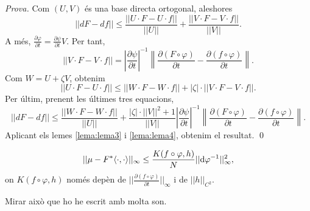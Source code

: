 {\color{green!50!black}
\textit{Prova.} Com $(U,V)$ és una base directa ortogonal, aleshores 
\begin{equation*}
    ||dF-df||\le \frac{||U\cdot F - U\cdot f||}{||U||} + \frac{||V\cdot F - V\cdot f||}{||V||}.
\end{equation*}
A més, $\frac{\partial \varphi}{\partial t} = \frac{\partial \psi}{\partial t}V$. Per tant,
\begin{equation}\label{eq: dospuntonze}
    ||V\cdot F - V\cdot f|| = \left|\frac{\partial\psi}{\partial t}\right|^{-1} \left\| \frac{\partial(F\circ\varphi)}{\partial t} - \frac{\partial(f\circ\varphi)}{\partial t} \right\|.
\end{equation}
Com $W=U+\zeta V$, obtenim
\begin{equation*}
    ||U\cdot F - U\cdot f|| \le ||W\cdot F - W\cdot f|| + |\zeta |\cdot||V\cdot F - V\cdot f||.
\end{equation*}
Per últim, prenent les últimes tres equacions,
\begin{equation}\label{eq:demo lema 6}
    ||dF-df||\le \frac{||W\cdot F - W\cdot f||}{||U||} + \frac{|\zeta|\cdot||V||^2+1}{||V||}\left|\frac{\partial\psi}{\partial t}\right|^{-1} \left\| \frac{\partial(F\circ\varphi)}{\partial t} - \frac{\partial(f\circ\varphi)}{\partial t} \right\|.
\end{equation}
Aplicant els lemes \ref{lema:lema3} i \ref{lema:lema4}, obtenim el resultat. \qed
}
\begin{lema}
    \label{lema:lema7}
    \begin{equation*}
        ||\mu-F^*\langle\cdot, \cdot\rangle||_\infty \le \frac{K(f\circ\varphi,h)}{N}||\textrm d\varphi ^{-1}||_\infty^2,
    \end{equation*}
    on $K(f\circ\varphi,h)$ només depèn de $||\frac{\partial(f\circ\varphi)}{\partial t}||_\infty$ i de $||h||_{C^2}$.
\end{lema}
{\color{blue} Mirar això que ho he escrit amb molta son.}


